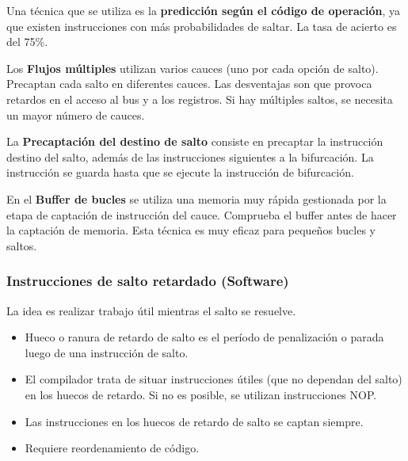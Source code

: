 Una técnica que se utiliza es la \textbf{predicción según el código de operación}, ya que existen instrucciones con más probabilidades de saltar. La tasa de acierto es del 75\%.

Los \textbf{Flujos múltiples} utilizan varios cauces (uno por cada opción de salto). Precaptan cada salto en diferentes cauces. Las desventajas son que provoca retardos en el acceso al bus y a los registros. Si hay múltiples saltos, se necesita un mayor número de cauces.

La \textbf{Precaptación del destino de salto} consiste en precaptar la instrucción destino del salto, además de las instrucciones siguientes a la bifurcación. La instrucción se guarda hasta que se ejecute la instrucción de bifurcación.

En el \textbf{Buffer de bucles} se utiliza una memoria muy rápida gestionada por la etapa de captación de instrucción del cauce. Comprueba el buffer antes de hacer la captación de memoria. Esta técnica es muy eficaz para pequeños bucles y saltos.

\subsubsection{Instrucciones de salto retardado (Software)}

La idea es realizar trabajo útil mientras el salto se resuelve.

\begin{itemize}
  \item Hueco o ranura de retardo de salto es el período de penalización o parada luego de una instrucción de salto.
  \item El compilador trata de situar instrucciones útiles (que no dependan del salto) en los huecos de retardo. Si no es posible, se utilizan instrucciones NOP.\@
  \item Las instrucciones en los huecos de retardo de salto se captan siempre.
  \item Requiere reordenamiento de código.
\end{itemize}